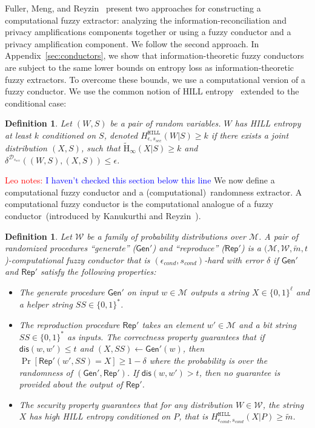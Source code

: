 \documentclass[11pt]{article}
\newcommand{\apref}[1]{\mbox{Appendix~\ref{#1}}}
\newcommand{\class}[1]{{\ensuremath{\mathsf{#1}}}}
\newcommand{\gen}{\ensuremath{\class{Gen}}\xspace}
\newcommand{\rep}{\ensuremath{\class{Rep}}\xspace}
\newcommand{\dis}{\ensuremath{\mathsf{dis}}}
\newcommand{\hill}{\ensuremath{\mathtt{HILL}}\xspace}
\newcommand{\Hav}{\tilde{\mathrm{H}}_\infty}
\newtheorem{definition}[theorem]{Definition}
\newcommand{\authnote}[2]{{\textcolor{red}{\textsf{#1 notes: }\textcolor{blue}{ #2}}\marginpar{\textcolor{red}{\textbf{!!!!!}}}}}
\newcommand{\authnote}[2]{}
\newcommand{\lnote}[1]{{\authnote{Leo}{#1}}}
\begin{document}
Fuller, Meng, and Reyzin~\cite{fuller2013computational} present two approaches for constructing a computational fuzzy extractor: analyzing the information-reconciliation and privacy amplifications components together or using a fuzzy conductor and a privacy amplification component.  We follow the second approach.
In \apref{sec:conductors}, we show that information-theoretic fuzzy conductors are subject to the same lower bounds on entropy loss as information-theoretic  fuzzy extractors.  To overcome these bounds, we use a computational version of a fuzzy conductor.
We use the common notion of HILL entropy~\cite{DBLP:journals/siamcomp/HastadILL99} extended to the conditional case:
\begin{definition}
\label{def:hill ent}
Let $(W, S)$ be a pair of random variables.  $W$ has
\emph{HILL entropy} at least $k$ conditioned on $S$,
denoted $H^{\hill}_{\epsilon, s_{sec}}(W|S)\geq k$ if there exists a joint distribution $(X, S)$, such that $\Hav(X|S)\geq k$ and $\delta^{\mathcal{D}_{s_{sec}}} ((W, S),(X,S))\leq \epsilon$.
\end{definition} \lnote{I haven't checked this section below this line}
We now define a computational fuzzy conductor and a (computational)~randomness extractor.  A computational fuzzy conductor is the computational analogue of a fuzzy conductor~(introduced by Kanukurthi and Reyzin~\cite{KanukurthiR09}).
\begin{definition}
\label{def:comp fuzzy cond}
Let $\mathcal{W}$ be a family of probability distributions over $\mathcal{M}$.  A pair of randomized procedures ``generate'' ($\gen'$) and ``reproduce'' ($\rep'$) is a $(\mathcal{M}, \mathcal{W}, \tilde{m}, t$)-computational fuzzy conductor that is $(\epsilon_{cond}, s_{cond})$-hard with error $\delta$ if $\gen'$ and $\rep'$ satisfy the following properties:
\begin{itemize}
\item The generate procedure $\gen'$ on input $w\in \mathcal{M}$ outputs a string $X\in\{0,1\}^\ell$ and a helper string $SS\in\{0,1\}^*$.
\item The reproduction procedure $\rep'$ takes an element $w'\in\mathcal{M}$ and a bit string $SS\in\{0,1\}^*$ as inputs.  The \emph{correctness} property guarantees that if $\dis(w, w')\leq t$ and $(X, SS)\leftarrow \gen'(w)$, then $\Pr[\rep'( w', SS) = X] \geq 1-\delta$ where the probability is over the randomness of $(\gen', \rep')$.
If $\dis(w, w') > t$, then no guarantee is provided about the output of $\rep'$.
\item The \emph{security} property guarantees that for any distribution $W\in \mathcal{W}$, the string $X$ has high HILL entropy conditioned on $P$, that is $H^{\hill}_{\epsilon_{cond}, s_{cond}}(X |P)\geq \tilde{m}$.
\end{itemize}
\end{definition}
\end{document}
